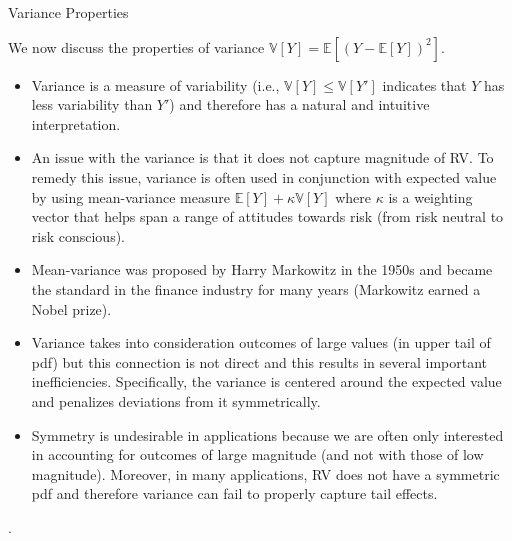 \documentclass[handout,9pt]{beamer}
\begin{document}
%
\begin{frame}{Variance Properties}


We now discuss the properties of variance $\mathbb{V}[Y]=\mathbb{E}[(Y-\mathbb{E}[Y])^2]$.

\begin{itemize}
\setlength{\itemsep}{10pt}
\item Variance is a measure of variability (i.e., $\mathbb{V}[Y]\leq \mathbb{V}[Y']$ indicates that $Y$ has less variability than $Y'$) and therefore has a natural and intuitive interpretation.  

\item An issue with the variance is that it does not capture magnitude of RV. To remedy this issue, variance is often used in conjunction with expected value by using mean-variance measure $\mathbb{E}[Y]+\kappa\mathbb{V}[Y]$ where $\kappa$ is a weighting vector that helps span a range of attitudes towards risk (from risk neutral to risk conscious). 

\item Mean-variance was proposed by Harry Markowitz in the 1950s and became the standard in the finance industry for many years (Markowitz earned a Nobel prize). 

\item Variance takes into consideration outcomes of large values (in upper tail of pdf) but this connection is not direct and this results in several important inefficiencies.   Specifically, the variance is centered around the expected value and penalizes deviations from it symmetrically. 

\item Symmetry is undesirable in applications because we are often only interested in accounting for outcomes of large magnitude (and not with those of low magnitude).  Moreover, in many applications,  RV does not have a symmetric pdf and therefore variance can fail to properly capture tail effects.  

\end{itemize}
. 


\end{frame}
\end{document}
